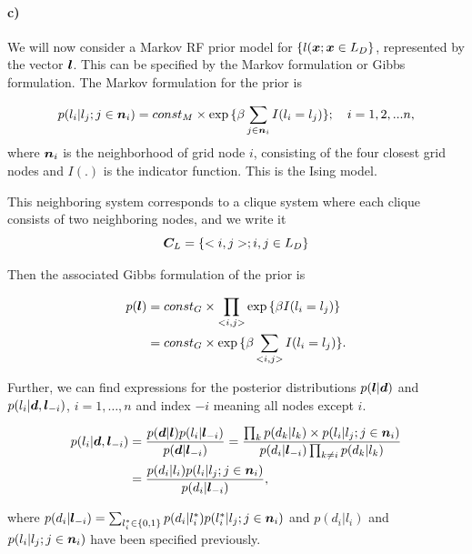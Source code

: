\paragraph{c)}
We will now consider a Markov RF prior model for $\{l(\bm{x}; \bm{x} \in L_D\}$, represented by the vector $\bm{l}$.
This can be specified by the Markov formulation or Gibbs formulation. The Markov formulation for the prior is 

\begin{equation}
    p(l_i|l_j; j \in \bm{n}_i) = const_M \times \exp{\{\beta \sum_{j\in \bm{n}_i} I(l_i = l_j)\}}; \quad i = 1,2,...n,
\end{equation}
where $\bm{n}_i$ is the neighborhood of grid node $i$, consisting of the four closest grid nodes and $I(.)$ is the indicator function. This is the Ising model. 

This neighboring system corresponds to a clique system where each clique consists of two neighboring nodes, and we write it
\begin{equation}
    \bm{C}_L = \{<i,j>; i,j \in L_D\}
\end{equation}

Then the associated Gibbs formulation of the prior is

\begin{align}
    p(\bm{l}) &= const_G \times \prod_{<i,j>} \exp{\{\beta I(l_i = l_j)\}}\\
    & = const_G \times \exp{\{\beta \sum_{<i,j>} I(l_i = l_j)\}}.
\end{align}

Further, we can find expressions for the posterior distributions $p(\bm{l}|\bm{d})$ and $p(l_i | \bm{d}, \bm{l}_{-i})$, $i = 1, \dots, n$ and index $-i$ meaning all nodes except $i$. 

\begin{align*}
    p(l_i | \bm{d}, \bm{l}_{-i}) &= \frac{p(\bm{d}|\bm{l})p(l_i|\bm{l}_{-i})}{p(\bm{d}|\bm{l}_{-i})}  = \frac{\prod_{k} p(d_k|l_k)\times p(l_i|l_j; j\in \bm{n}_i)}{p(d_i|\bm{l}_{-i})\prod_{k\neq i}p(d_k|l_k)}\\
    & = \frac{p(d_i|l_i)p(l_i|l_j; j\in \bm{n}_i)}{p(d_i|\bm{l}_{-i})},
\end{align*}

where $p(d_i|\bm{l}_{-i}) = \sum_{l_i^*\in \{0,1\}} p(d_i|l_i^*)p(l_i^*|l_j; j\in \bm{n}_i)$ and $p(d_i|l_i)$ and $p(l_i|l_j; j\in \bm{n}_i)$ have been specified previously. 


